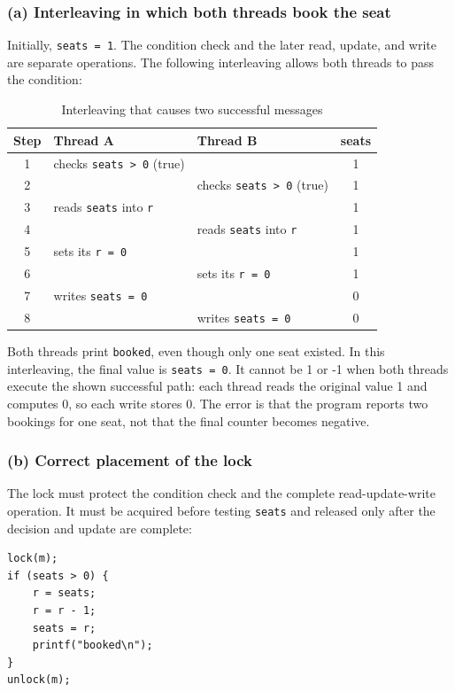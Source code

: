 \documentclass[conference]{IEEEtran}
\begin{document}
\subsubsection{(a) Interleaving in which both threads book the seat}
Initially, \texttt{seats = 1}. The condition check and the later read, update, and write are separate operations. The following interleaving allows both threads to pass the condition:

\begin{table}[H]
\centering
\caption{Interleaving that causes two successful messages}
\begin{tabular}{c|l|l|c}
Step & Thread A & Thread B & seats\\ \hline
1 & checks \texttt{seats > 0} (true) & & 1\\
2 & & checks \texttt{seats > 0} (true) & 1\\
3 & reads \texttt{seats} into \texttt{r} & & 1\\
4 & & reads \texttt{seats} into \texttt{r} & 1\\
5 & sets its \texttt{r = 0} & & 1\\
6 & & sets its \texttt{r = 0} & 1\\
7 & writes \texttt{seats = 0} & & 0\\
8 & & writes \texttt{seats = 0} & 0
\end{tabular}
\end{table}

Both threads print \texttt{booked}, even though only one seat existed. In this interleaving, the final value is \texttt{seats = 0}. It cannot be 1 or -1 when both threads execute the shown successful path: each thread reads the original value 1 and computes 0, so each write stores 0. The error is that the program reports two bookings for one seat, not that the final counter becomes negative.

\subsubsection{(b) Correct placement of the lock}
The lock must protect the condition check and the complete read-update-write operation. It must be acquired before testing \texttt{seats} and released only after the decision and update are complete:

\begin{lstlisting}[style=cstyle]
lock(m);
if (seats > 0) {
    r = seats;
    r = r - 1;
    seats = r;
    printf("booked\n");
}
unlock(m);
\end{lstlisting}
\end{document}
